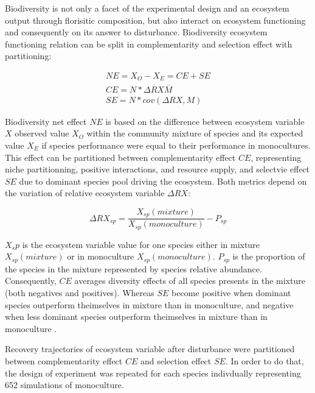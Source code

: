 \documentclass[]{article}
\theoremstyle{definition}
\theoremstyle{definition}
\theoremstyle{remark}
\begin{document}
Biodiversity is not only a facet of the experimental design and an
ecosystem output through florisitic composition, but also interact on
ecosystem functioning and consequently on its answer to disturbance.
Biodiversity ecosystem functioning relation can be split in
complementarity and selection effect with \citet{Loreau2001}
partitioning:

\begin{equation}
  \begin{array}{c}
    NE = X_O - X_E = CE + SE \\
    CE = N* \overline{\Delta RX} \overline{M}\\
    SE = N*cov(\Delta RX,M)
  \end{array}
  \label{eq:BiodivPart}
\end{equation}

Biodiversity net effect \(NE\) is based on the difference between
ecosystem variable \(X\) observed value \(X_O\) within the community
mixture of species and its expected value \(X_E\) if species performance
were equal to their performance in monocultures. This effect can be
partitioned between complementarity effect \(CE\), representing niche
partitionning, positive interactions, and resource supply, and selectvie
effect \(SE\) due to dominant species pool driving the ecosystem. Both
metrics depend on the variation of relative ecosystem variable
\(\Delta RX\):

\begin{equation}
  \Delta RX_{sp} = \frac{X_{sp}(mixture)}{X_{sp}(monoculture)} - P_{sp}
  \label{eq:DeltaRY}
\end{equation}

\(X_sp\) is the ecosystem variable value for one species either in
mixture \(X_{sp}(mixture)\) or in monoculture \(X_{sp}(monoculture)\).
\(P_{sp}\) is the proportion of the species in the mixture represented
by species relative abundance. Consequently, \(CE\) averages diversity
effects of all species presents in the mixture (both negatives and
positives). Whereas \(SE\) become positive when dominant species
outperform theimselves in mixture than in monoculture, and negative when
less dominant species outperform theimselves in mixture than in
monoculture \citep{Tobner2016}.

Recovery trajectories of ecosystem variable after disturbance were
partitioned between complementarity effect \(CE\) and selection effect
\(SE\). In order to do that, the design of experiment was repeated for
each species indivdually representing 652 simulations of monoculture.
\end{document}

